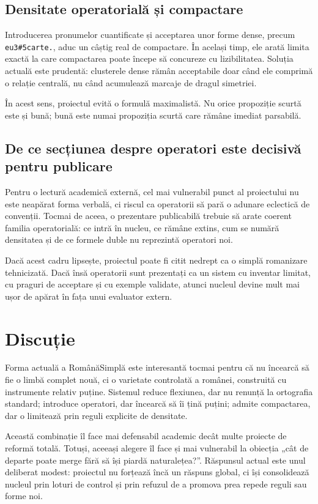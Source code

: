 \documentclass[12pt,onecolumn,letterpaper]{article}
\newcommand{\rs}[1]{\texttt{#1}}
\begin{document}
\subsection{Densitate operatorială și compactare}

Introducerea pronumelor cuantificate și acceptarea unor forme dense, precum
\rs{eu3\#5carte.}, aduc un câștig real de compactare. În același timp, ele arată
limita exactă la care compactarea poate începe să concureze cu lizibilitatea.
Soluția actuală este prudentă: clusterele dense rămân acceptabile doar când ele
comprimă o relație centrală, nu când acumulează marcaje de dragul simetriei.

În acest sens, proiectul evită o formulă maximalistă. Nu orice propoziție scurtă
este și bună; bună este numai propoziția scurtă care rămâne imediat parsabilă.

\subsection{De ce secțiunea despre operatori este decisivă pentru publicare}

Pentru o lectură academică externă, cel mai vulnerabil punct al proiectului nu
este neapărat forma verbală, ci riscul ca operatorii să pară o adunare
eclectică de convenții. Tocmai de aceea, o prezentare publicabilă trebuie să
arate coerent familia operatorială: ce intră în nucleu, ce rămâne extins, cum se
numără densitatea și de ce formele duble nu reprezintă operatori noi.

Dacă acest cadru lipsește, proiectul poate fi citit nedrept ca o simplă
romanizare tehnicizată. Dacă însă operatorii sunt prezentați ca un sistem cu
inventar limitat, cu praguri de acceptare și cu exemple validate, atunci nucleul
devine mult mai ușor de apărat în fața unui evaluator extern.

\section{Discuție}

Forma actuală a RomânăSimplă este interesantă tocmai pentru că nu încearcă să
fie o limbă complet nouă, ci o varietate controlată a românei, construită cu
instrumente relativ puține. Sistemul reduce flexiunea, dar nu renunță la
ortografia standard; introduce operatori, dar încearcă să îi țină puțini;
admite compactarea, dar o limitează prin reguli explicite de densitate.

Această combinație îl face mai defensabil academic decât multe proiecte de
reformă totală. Totuși, aceeași alegere îl face și mai vulnerabil la obiecția
„cât de departe poate merge fără să își piardă naturalețea?”. Răspunsul actual
este unul deliberat modest: proiectul nu forțează încă un răspuns global, ci își
consolidează nucleul prin loturi de control și prin refuzul de a promova prea
repede reguli sau forme noi.
\end{document}
